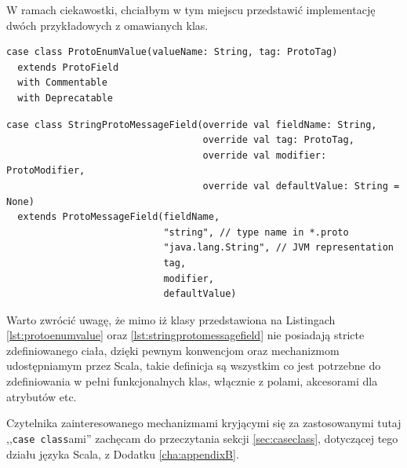 \documentclass[pdflatex,11pt]{aghdpl}
\begin{document}
W ramach ciekawostki, chciałbym w tym miejscu przedstawić implementację dwóch przykładowych z omawianych klas.

\begin{lstlisting}[caption={Pełna implementacja klasy ProtoEnumValue}, label={lst:protoenumvalue}]
case class ProtoEnumValue(valueName: String, tag: ProtoTag)
  extends ProtoField
  with Commentable
  with Deprecatable
\end{lstlisting}

\begin{lstlisting}[caption={Pełna implementacja klasy StringProtoMessageField}, label={lst:stringprotomessagefield}]
case class StringProtoMessageField(override val fieldName: String,
                                   override val tag: ProtoTag,
                                   override val modifier: ProtoModifier,
                                   override val defaultValue: String = None)
  extends ProtoMessageField(fieldName, 
                            "string", // type name in *.proto
                            "java.lang.String", // JVM representation
                            tag, 
                            modifier,
                            defaultValue)
\end{lstlisting}

Warto zwrócić uwagę, że mimo iż klasy przedstawiona na Listingach \ref{lst:protoenumvalue} oraz \ref{lst:stringprotomessagefield} nie posiadają stricte 
zdefiniowanego ciała, dzięki pewnym konwencjom oraz mechanizmom udostępniamym przez Scala, takie definicja są 
wszystkim co jest potrzebne do zdefiniowania w pełni funkcjonalnych klas, włącznie z polami, akcesorami dla atrybutów etc.

Czytelnika zainteresowanego mechanizmami kryjącymi się za zastosowanymi tutaj ,,\verb|case class|ami'' zachęcam do przeczytania sekcji \ref{sec:caseclass},
dotyczącej tego działu języka Scala, z Dodatku \ref{cha:appendixB}.
\end{document}
